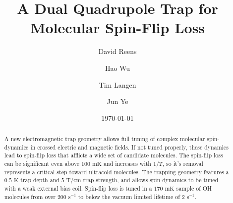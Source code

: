 \documentclass[%
 reprint,
groupedaddress,
 amsmath,amssymb,
 aps,
prl,
]{revtex4-1}
\begin{document}

\title{A Dual Quadrupole Trap for Molecular Spin-Flip Loss}%

\author{David Reens}
%
\author{Hao Wu}
\author{Tim Langen}%
\author{Jun Ye}
%

\date{\today}%


\begin{abstract}
A new electromagnetic trap geometry allows full tuning of complex molecular spin-dynamics in crossed electric and magnetic fields. If not tuned properly, these dynamics lead to spin-flip loss that afflicts a wide set of candidate molecules. The spin-flip loss can be significant even above $100\text{ mK}$ and increases with $1/T$, so it's removal represents a critical step toward ultracold molecules. The trapping geometry features a $0.5 \text{ K}$ trap depth and $5 \text{ T/cm}$ trap strength, and allows spin-dynamics to be tuned with a weak external bias coil. Spin-flip loss is tuned in a $170 \text{ mK}$ sample of OH molecules from over $200 \text{ s}^{-1} $ to below the vacuum limited lifetime of $2 \text{ s}^{-1}$.
\end{abstract}


\maketitle
\end{document}

